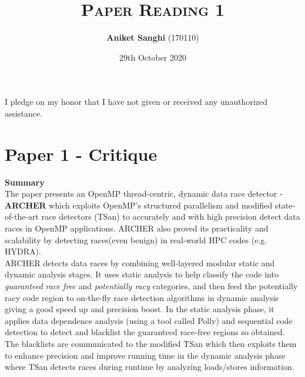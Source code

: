 \documentclass[a4paper]{article}
\title{\textsc{Paper Reading 1}}
\author{\textbf{Aniket Sanghi} (170110)}
\date{29th October 2020}
\begin{document}
\maketitle
\thispagestyle{fancy}
\fancyhead{}
\cfoot{\thepage}
\begin{center}
I pledge on my honor that I have not given or received any unauthorized assistance.\\
\end{center}

\section{Paper 1 - Critique} 
\vspace{0.5cm}
{\bf\Large Summary} \\

The paper presents an OpenMP thread-centric, dynamic data race detector - {\bf ARCHER} which exploits OpenMP's structured parallelism and modified state-of-the-art race detectors (TSan) to accurately and with high precision detect data races in OpenMP applications. ARCHER also proved its practicality and scalability by detecting races(even benign) in real-world HPC codes (e.g. HYDRA). \\

ARCHER detects data races by combining well-layered modular static and dynamic analysis stages. It uses static analysis to help classify the code into {\it guaranteed race free} and {\it potentially racy} categories, and then feed the potentially racy code region to on-the-fly race detection algorithms in dynamic analysis giving a good speed up and precision boost. In the static analysis phase, it applies data dependence analysis (using a tool called Polly) and sequential code detection to detect and blacklist the guaranteed race-free regions so obtained. The blacklists are communicated to the modified TSan which then exploits them to enhance precision and improve running time in the dynamic analysis phase where TSan detects races during runtime by analyzing loads/stores information.
\\
\end{document}
